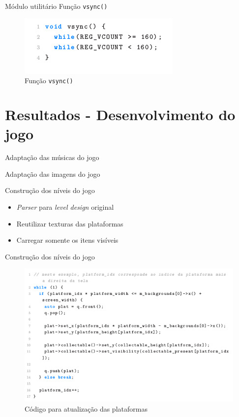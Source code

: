 \documentclass[notes, mathserif]{beamer}
\begin{document}
\begin{frame}{M\'odulo utilit\'ario}
	Fun\c c\~ao \texttt{vsync()}
	\begin{figure}[H]
		\includegraphics[width=.5\linewidth]{figuras/vsync.png}
		\centering
		\caption{Fun\c c\~ao \texttt{vsync()}}
		\label{fig:vsync}
	\end{figure}
\end{frame}

\section{Resultados - Desenvolvimento do jogo}

\begin{frame}{Adapta\c c\~ao das m\'usicas do jogo}
\end{frame}

\begin{frame}{Adapta\c c\~ao das imagens do jogo}
\end{frame}

\begin{frame}{Constru\c c\~ao dos n\'iveis do jogo}
	\begin{itemize}[<+->]
		\item \textit{Parser} para \textit{level design} original
		\item Reutilizar texturas das plataformas
		\item Carregar somente os itens vis\'iveis
	\end{itemize}
\end{frame}

\begin{frame}{Constru\c c\~ao dos n\'iveis do jogo}
	\begin{figure}[H]
		\includegraphics[width=.7\linewidth]{figuras/plats.png}
		\centering
		\caption{C\'odigo para atualiza\c c\~ao das plataformas}
		\label{fig:vsync}
	\end{figure}
\end{frame}
\end{document}
